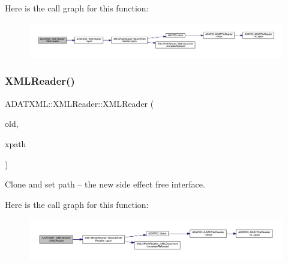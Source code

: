 Here is the call graph for this function\+:
\nopagebreak
\begin{figure}[H]
\begin{center}
\leavevmode
\includegraphics[width=350pt]{db/d3f/classADATXML_1_1XMLReader_a6829255c2dd448f4bf315f6fd0b380a1_cgraph}
\end{center}
\end{figure}
\mbox{\label{classADATXML_1_1XMLReader_aef69d83a0f47db461436fc2fd3bb7723}} 
\subsubsection{\texorpdfstring{XMLReader()}{XMLReader()}\hspace{0.1cm}{\footnotesize\ttfamily [10/15]}}
{\footnotesize\ttfamily A\+D\+A\+T\+X\+M\+L\+::\+X\+M\+L\+Reader\+::\+X\+M\+L\+Reader (\begin{DoxyParamCaption}\item[{\mbox{\hyperlink{classADATXML_1_1XMLReader}{X\+M\+L\+Reader}} \&}]{old,  }\item[{const std\+::string \&}]{xpath }\end{DoxyParamCaption})\hspace{0.3cm}{\ttfamily [inline]}}



Clone and set path -- the new side effect free interface. 

Here is the call graph for this function\+:
\nopagebreak
\begin{figure}[H]
\begin{center}
\leavevmode
\includegraphics[width=350pt]{db/d3f/classADATXML_1_1XMLReader_aef69d83a0f47db461436fc2fd3bb7723_cgraph}
\end{center}
\end{figure}
\mbox{\label{classADATXML_1_1XMLReader_a98c4936a3366f39443113290b7bd164a}} 
